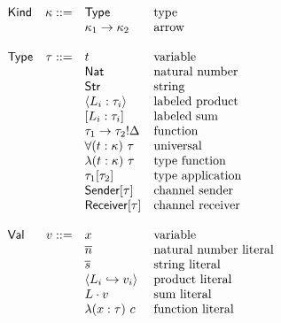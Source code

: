 \documentclass[12pt]{article}
\begin{document}
\[
\begin{array}{l r l l}
\textsf{Kind} & \kappa ::= & \textsf{Type}                     & \text{type} \\
              &            & \kappa_1 \rightarrow \kappa_2     & \text{arrow} \\
\\
\textsf{Type} &   \tau ::= & t                                 & \text{variable} \\
              &            & \textsf{Nat}                      & \text{natural number} \\
              &            & \textsf{Str}                      & \text{string} \\
              &            & \langle L_i : \tau_i \rangle      & \text{labeled product} \\
              &            & [ L_i : \tau_i ]                  & \text{labeled sum} \\
              &            & \tau_1 \rightarrow \tau_2!\Delta  & \text{function} \\
              &            & \forall (t : \kappa) \ \tau       & \text{universal} \\
              &            & \lambda (t : \kappa) \ \tau       & \text{type function} \\
              &            & \tau_1[\tau_2]                    & \text{type application} \\
              &            & \textsf{Sender}[\tau]             & \text{channel sender} \\
              &            & \textsf{Receiver}[\tau]           & \text{channel receiver} \\
\\
\textsf{Val}  &      v ::= & x                                 & \text{variable} \\
              &            & \overline{n}                      & \text{natural number literal} \\
              &            & \overline{s}                      & \text{string literal} \\
              &            & \langle
                             L_i \hookrightarrow v_i
                             \rangle                           & \text{product literal} \\
              &            & L \cdot v                         & \text{sum literal} \\
              &            & \lambda (x : \tau) \ c            & \text{function literal} \\

\end{array}\]
\end{document}
